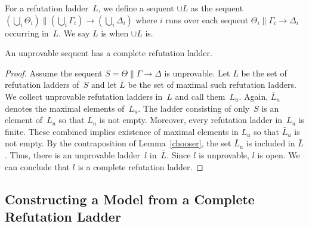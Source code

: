    For a refutation ladder~$L$, we define a sequent $\cup L$ as
   the sequent $\left(\bigcup_i \Theta_i\right)\parallel \left(\bigcup_i \Gamma_i\right)\longrightarrow
   \left(\bigcup_i\Delta_i\right)$ where $i$ runs over
   each sequent $\Theta_i\parallel \Gamma_i\longrightarrow\Delta_i$
   occurring in~$L$.
   We say $L$ is  when $\cup L$ is.

   \begin{lemma}
    \label{comprefl}
    An unprovable sequent has a complete refutation ladder.
   \end{lemma}
   \begin{proof}
    Assume the sequent
    $S = \Theta\parallel \Gamma\longrightarrow\Delta$
    is unprovable.
    Let $L$ be the set of refutation ladders of~$S$ and
    let $\bar L$ be the set of maximal such refutation ladders.
    We collect unprovable refutation ladders in~$L$ and call them~$L_u$.
    Again, $\bar L_u$ denotes the maximal elements of~$L_u$.
    The ladder consisting of only~$S$ is an element of~$L_u$
    so that $L_u$ is not empty.
    Moreover, every refutation ladder in~$L_u$ is finite.
    These combined implies existence of maximal elements in $L_u$ so that $\bar L_u$ is not empty.
    By the contraposition of Lemma~\ref{chooser}, the set $\bar L_u$ is included in $\bar L$.
    Thus, there is an unprovable ladder~$l$ in~$\bar L$.
    Since $l$ is unprovable, $l$ is open.
    We can conclude that $l$ is a complete refutation ladder.
   \end{proof}


   \subsection{Constructing a Model from a Complete Refutation Ladder}

